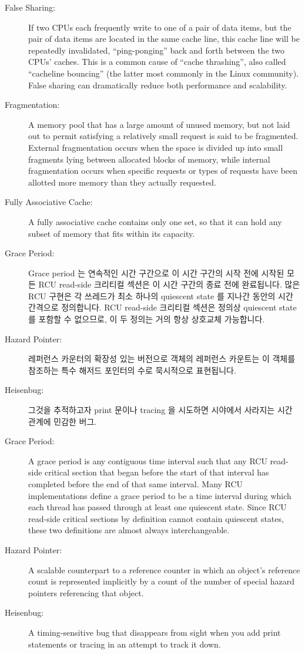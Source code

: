 \begin{description}
\item[False Sharing:]
	If two CPUs each frequently write to one of a pair of data items,
	but the pair of data items are located in the same cache line,
	this cache line will be repeatedly invalidated, ``ping-ponging''
	back and forth between the two CPUs' caches.
	This is a common cause of ``cache thrashing'', also called
	``cacheline bouncing'' (the latter most commonly in the Linux
	community).
	False sharing can dramatically reduce both performance and
	scalability.
\item[Fragmentation:]
	A memory pool that has a large amount of unused memory, but
	not laid out to permit satisfying a relatively small request
	is said to be fragmented.
	External fragmentation occurs when the space is divided up
	into small fragments lying between allocated blocks of memory,
	while internal fragmentation occurs when specific requests or
	types of requests have been allotted more memory than they
	actually requested.
\item[Fully Associative Cache:]
	A fully associative cache contains only
	one set, so that it can hold any subset of
	memory that fits within its capacity.

\fi

\item[Grace Period:]
	Grace period 는 연속적인 시간 구간으로 이 시간 구간의 시작 전에 시작된
	모든 RCU read-side 크리티컬 섹션은 이 시간 구간의 종료 전에 완료됩니다.
	많은 RCU 구현은 각 쓰레드가 최소 하나의 quiescent state 를 지나간
	동안의 시간 간격으로 정의합니다.
	RCU read-side 크리티컬 섹션은 정의상 quiescent state 를 포함할 수
	없으므로, 이 두 정의는 거의 항상 상호교체 가능합니다.
\item[Hazard Pointer:]
	레퍼런스 카운터의 확장성 있는 버전으로 객체의 레퍼런스 카운트는 이
	객체를 참조하는 특수 해저드 포인터의 수로 묵시적으로 표현됩니다.
\item[Heisenbug:]
	그것을 추적하고자 print 문이나 tracing 을 시도하면 시야에서 사라지는
	시간 관계에 민감한 버그.

\iffalse

\item[Grace Period:]
	A grace period is any contiguous time interval such that
	any RCU read-side critical section that began before the
	start of that interval has
	completed before the end of that same interval.
	Many RCU implementations define a grace period to be a
	time interval during which each thread has passed through at
	least one quiescent state.
	Since RCU read-side critical sections by definition cannot
	contain quiescent states, these two definitions are almost
	always interchangeable.
\item[Hazard Pointer:]
	A scalable counterpart to a reference counter in which an
	object's reference count is represented implicitly by a count
	of the number of special hazard pointers referencing that object.
\item[Heisenbug:]
	A timing-sensitive bug that disappears from sight when you
	add print statements or tracing in an attempt to track it
	down.


\end{description}
